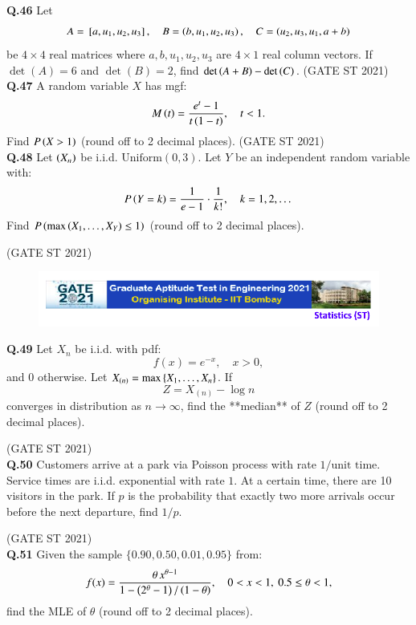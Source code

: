 \documentclass[journal,12pt,onecolumn]{IEEEtran}
\theoremstyle{remark}
\begin{document}
\textbf{Q.46}
Let 
\[
A = {}\left[a, u_1, u_2, u_3\right], \quad
B = \left(b, u_1, u_2, u_3\right), \quad
C = \left(u_2, u_3, u_1, a+b\right)
\]
be $4\times 4$ real matrices where $a,b,u_1,u_2,u_3$ are $4 \times 1$ real column vectors.  
If $\det(A) = 6$ and $\det(B) = 2$, find $\det\left(A+B\right) - \det\left(C\right)$.
\hfill (GATE ST 2021) \\
\textbf{Q.47}
A random variable $X$ has mgf:
\[
M\left(t\right) = \frac{e^t - 1}{t\left(1-t\right)}, \quad t < 1.
\]
Find $P\left(X > 1\right)$ (round off to 2 decimal places).
\hfill (GATE ST 2021) \\
\textbf{Q.48}
Let $\left( X_n \right)$ be i.i.d. $\text{Uniform}(0,3)$.  
Let $Y$ be an independent random variable with:
\[
P\left(Y = k\right) = \frac{1}{e-1} \cdot \frac{1}{k!}, \quad k = 1,2,\dots
\]
Find $P\left( \max\left( X_1,\dots,X_Y \right) \le 1 \right)$ (round off to 2 decimal places).

\hfill (GATE ST 2021) \\

\begin{figure}
 \centering
    \includegraphics[width=1\linewidth]{figs/0.png} 
\end{figure}

\textbf{Q.49}
Let  $X_n$ be i.i.d. with pdf:
\[
f(x) = e^{-x}, \quad x > 0,
\]
and $0$ otherwise.  
Let $X_{(n)} = \max\left\{ X_1,\dots,X_n \right\}$. If 
\[
Z = X_{(n)} - \log n
\]
converges in distribution as $n \to \infty$, find the **median** of $Z$ (round off to 2 decimal places).

\hfill (GATE ST 2021) \\

\textbf{Q.50}
Customers arrive at a park via Poisson process with rate $1/\text{unit time}$.  
Service times are i.i.d. exponential with rate $1$. At a certain time, there are 10 visitors in the park.  
If $p$ is the probability that exactly two more arrivals occur before the next departure, find $1/p$.

\hfill (GATE ST 2021) \\

\textbf{Q.51}
Given the sample $\{0.90, 0.50, 0.01, 0.95 \}$ from:
\[
f(x) = \frac{\theta\, x^{\theta - 1}}{1 - \left(2^{\theta} - 1\right)/\left(1- \theta\right)}, \quad 0 < x < 1, \ 0.5 \le \theta < 1,
\]
find the MLE of $\theta$ (round off to 2 decimal places).
\end{document}
